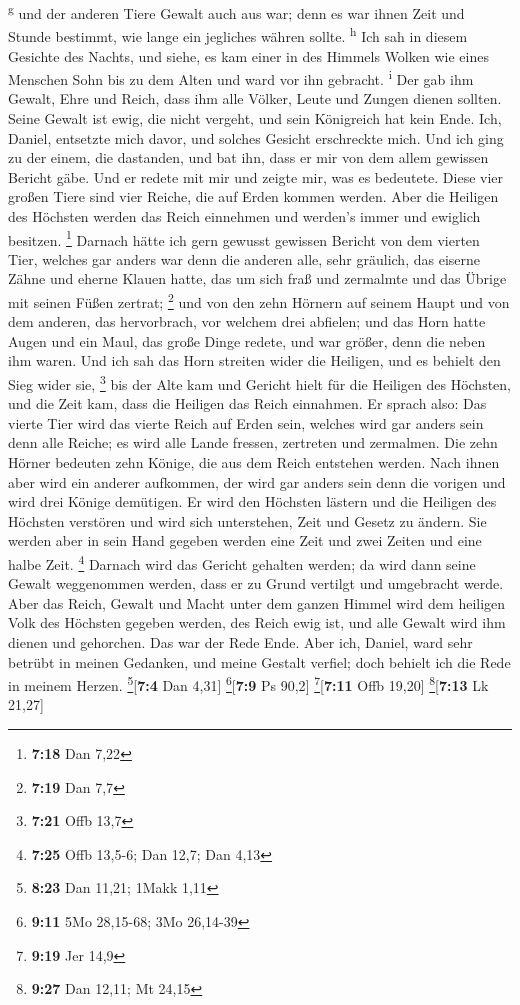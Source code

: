 \textsuperscript{g}  und der anderen Tiere Gewalt auch
aus war; denn es war ihnen Zeit und Stunde bestimmt, wie lange ein
jegliches währen sollte. \textsuperscript{h}  Ich sah in
diesem Gesichte des Nachts, und siehe, es kam einer in des Himmels
Wolken wie eines Menschen Sohn bis zu dem Alten und ward vor ihn
gebracht. \textsuperscript{i}  Der gab ihm Gewalt, Ehre
und Reich, dass ihm alle Völker, Leute und Zungen dienen sollten. Seine
Gewalt ist ewig, die nicht vergeht, und sein Königreich hat kein Ende.
 Ich, Daniel, entsetzte mich davor, und solches Gesicht
erschreckte mich.  Und ich ging zu der einem, die
dastanden, und bat ihn, dass er mir von dem allem gewissen Bericht gäbe.
Und er redete mit mir und zeigte mir, was es bedeutete. 
Diese vier großen Tiere sind vier Reiche, die auf Erden kommen werden.
 Aber die Heiligen des Höchsten werden das Reich
einnehmen und werden's immer und ewiglich besitzen. \footnote{\textbf{7:18}
  Dan 7,22}  Darnach hätte ich gern gewusst gewissen
Bericht von dem vierten Tier, welches gar anders war denn die anderen
alle, sehr gräulich, das eiserne Zähne und eherne Klauen hatte, das um
sich fraß und zermalmte und das Übrige mit seinen Füßen zertrat;
\footnote{\textbf{7:19} Dan 7,7}  und von den zehn
Hörnern auf seinem Haupt und von dem anderen, das hervorbrach, vor
welchem drei abfielen; und das Horn hatte Augen und ein Maul, das große
Dinge redete, und war größer, denn die neben ihm waren. 
Und ich sah das Horn streiten wider die Heiligen, und es behielt den
Sieg wider sie, \footnote{\textbf{7:21} Offb 13,7}  bis
der Alte kam und Gericht hielt für die Heiligen des Höchsten, und die
Zeit kam, dass die Heiligen das Reich einnahmen.  Er
sprach also: Das vierte Tier wird das vierte Reich auf Erden sein,
welches wird gar anders sein denn alle Reiche; es wird alle Lande
fressen, zertreten und zermalmen.  Die zehn Hörner
bedeuten zehn Könige, die aus dem Reich entstehen werden. Nach ihnen
aber wird ein anderer aufkommen, der wird gar anders sein denn die
vorigen und wird drei Könige demütigen.  Er wird den
Höchsten lästern und die Heiligen des Höchsten verstören und wird sich
unterstehen, Zeit und Gesetz zu ändern. Sie werden aber in sein Hand
gegeben werden eine Zeit und zwei Zeiten und eine halbe Zeit.
\footnote{\textbf{7:25} Offb 13,5-6; Dan 12,7; Dan 4,13} 
Darnach wird das Gericht gehalten werden; da wird dann seine Gewalt
weggenommen werden, dass er zu Grund vertilgt und umgebracht werde.
 Aber das Reich, Gewalt und Macht unter dem ganzen Himmel
wird dem heiligen Volk des Höchsten gegeben werden, des Reich ewig ist,
und alle Gewalt wird ihm dienen und gehorchen.  Das war
der Rede Ende. Aber ich, Daniel, ward sehr betrübt in meinen Gedanken,
und meine Gestalt verfiel; doch behielt ich die Rede in meinem Herzen.
\footnote{\textbf{8:23} Dan 11,21; 1Makk 1,11}{[}\textbf{7:4} Dan
4,31{]} \footnote{\textbf{9:11} 5Mo 28,15-68; 3Mo 26,14-39}{[}\textbf{7:9}
Ps 90,2{]} \footnote{\textbf{9:19} Jer 14,9}{[}\textbf{7:11} Offb
19,20{]} \footnote{\textbf{9:27} Dan 12,11; Mt 24,15}{[}\textbf{7:13} Lk
21,27{]}


